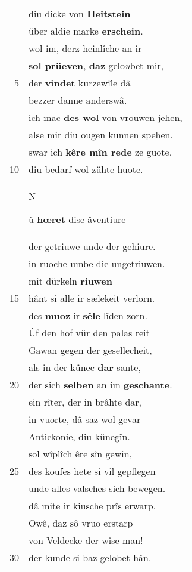 \documentclass[8pt,a4paper,notitlepage]{article}
\begin{document}
\begin{table}[ht]
\begin{minipage}[t]{0.5\linewidth}
\begin{center}
\end{center}
\begin{tabular}{rl}
 & diu dicke von \textbf{Heitstein}\\ 
 & über aldie marke \textbf{erschein}.\\ 
 & wol im, derz heinlîche an ir\\ 
 & \textbf{sol prüeven}, \textbf{daz} gelo\textit{u}bet mir,\\ 
5 & der \textbf{vindet} kurzewîle dâ\\ 
 & bezzer danne anderswâ.\\ 
 & ich mac \textbf{des wol} von vrouwen jehen,\\ 
 & alse mir diu ougen kunnen spehen.\\ 
 & swar ich \textbf{kêre mîn rede} ze guote,\\ 
10 & diu bedarf wol zühte huote.\\ 
 & \begin{large}N\end{large}û \textbf{hœret} dise âventiure\\ 
 & der getriuwe unde der gehiure.\\ 
 & in ruoche umbe die ungetriuwen.\\ 
 & mit dürkeln \textbf{riuwen}\\ 
15 & hânt si alle ir sælekeit verlorn.\\ 
 & des \textbf{muoz} ir \textbf{sêle} lîden zorn.\\ 
 & Ûf den hof vür den palas reit\\ 
 & Gawan gegen der gesellecheit,\\ 
 & als in der künec \textbf{dar} sante,\\ 
20 & der sich \textbf{selben} an im \textbf{geschante}.\\ 
 & ein rîter, der in brâhte dar,\\ 
 & in vuorte, dâ saz wol gevar\\ 
 & Antickonie, diu künegîn.\\ 
 & sol wîplîch êre sîn gewin,\\ 
25 & des koufes hete si vil gepflegen\\ 
 & unde alles valsches sich bewegen.\\ 
 & dâ mite ir kiusche prîs erwarp.\\ 
 & Owê, daz sô vruo erstarp\\ 
 & von Veldecke der wîse man!\\ 
30 & der kunde si baz gelobet hân.\\ 

\end{tabular}
\end{minipage}
\end{table}
\end{document}
